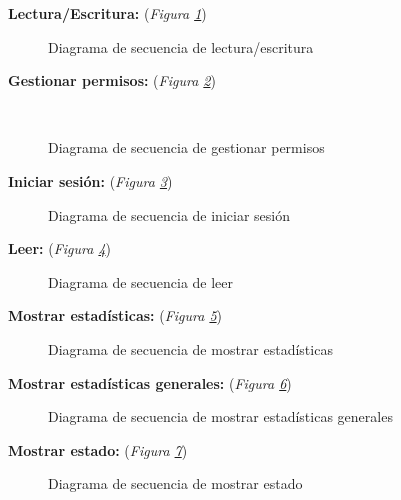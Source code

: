 \textbf{Lectura/Escritura:} (\emph{Figura \ref{fig:seqEscrituraLectura}}) 

\begin{figure}[H]
\centering
\seqEscrituraLectura
\caption{Diagrama de secuencia de lectura/escritura}
\label{fig:seqEscrituraLectura}
\end{figure}

\textbf{Gestionar permisos:} (\emph{Figura \ref{fig:seqGestionarPermisos}}) 

\begin{figure}[H]
\centering
\
\caption{Diagrama de secuencia de gestionar permisos}
\label{fig:seqGestionarPermisos}
\end{figure}

\textbf{Iniciar sesión:} (\emph{Figura \ref{fig:seqIniciarSesion}}) 

\begin{figure}[H]
\centering
\seqIniciarSesion
\caption{Diagrama de secuencia de iniciar sesión}
\label{fig:seqIniciarSesion}
\end{figure}

\textbf{Leer:} (\emph{Figura \ref{fig:seqLeer}}) 

\begin{figure}[H]
\centering
\seqLeer
\caption{Diagrama de secuencia de leer}
\label{fig:seqLeer}
\end{figure}

\textbf{Mostrar estadísticas:} (\emph{Figura \ref{fig:seqMostrarEstadisticas}}) 

\begin{figure}[H]
\centering
\seqMostrarEstadisticas
\caption{Diagrama de secuencia de mostrar estadísticas}
\label{fig:seqMostrarEstadisticas}
\end{figure}

\textbf{Mostrar estadísticas generales:} (\emph{Figura \ref{fig:seqMostrarEstadisticasGenerales}}) 

\begin{figure}[H]
\centering
\seqMostrarEstadisticasGenerales
\caption{Diagrama de secuencia de mostrar estadísticas generales}
\label{fig:seqMostrarEstadisticasGenerales}
\end{figure}

\textbf{Mostrar estado:} (\emph{Figura \ref{fig:seqMostrarEstado}}) 

\begin{figure}[H]
\centering
\seqMostrarEstado
\caption{Diagrama de secuencia de mostrar estado}
\label{fig:seqMostrarEstado}
\end{figure}








